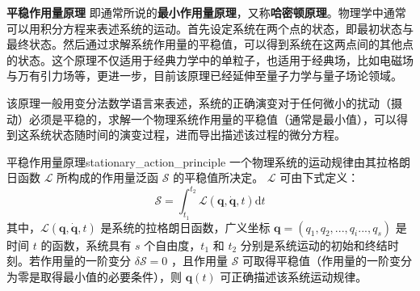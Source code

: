 \documentclass[cn,11pt,chinese,blue,bibstyle=ieeetr]{elegantbook}
\begin{document}
{\textbf{平稳作用量原理} 即通常所说的\textbf{最小作用量原理}，又称\textbf{哈密顿原理}。物理学中通常可以用积分方程来表述系统的运动。首先设定系统在两个点的状态，即最初状态与最终状态。然后通过求解系统作用量的平稳值，可以得到系统在这两点间的其他点的状态。这个原理不仅适用于经典力学中的单粒子，也适用于经典场，比如电磁场与万有引力场等，更进一步，目前该原理已经延伸至量子力学与量子场论领域。

该原理一般用变分法数学语言来表述，系统的正确演变对于任何微小的扰动（摄动）必须是平稳的，求解一个物理系统作用量的平稳值（通常是最小值），可以得到这系统状态随时间的演变过程，进而导出描述该过程的微分方程。

\begin{theorem}{平稳作用量原理}{stationary_action_principle}
一个物理系统的运动规律由其拉格朗日函数 $\mathcal{L}$ 所构成的作用量泛函 $\mathcal{S}$ 的平稳值所决定。 $\mathcal{L}$ 可由下式定义：
	\begin{equation}
		\mathcal{S} = \int_{t_1}^{t_2} {\mathcal{L}(\bm{q}, \dot{\bm{q}}, t) \mathrm{d} t}
	\end{equation}
其中，$\mathcal{L}(\bm{q}, \bm{\dot{q}}, t)$ 是系统的拉格朗日函数，广义坐标 $\bm{q} = (q_1, q_2, ..., q_i ..., q_s)$ 是时间 $t$ 的函数，系统具有 $s$ 个自由度，$t_1$ 和 $t_2$ 分别是系统运动的初始和终结时刻。若作用量的一阶变分 $\delta{\mathcal{S}} = 0$ ，且作用量 $\mathcal{S}$ 可取得平稳值（作用量的一阶变分为零是取得最小值的必要条件），则 $\bm{q}(t)$ 可正确描述该系统运动规律。
\end{theorem}

}
\end{document}
